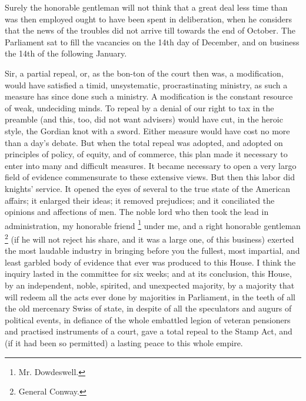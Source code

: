 Surely the honorable gentleman will not think that a great deal less time than was then employed ought to have been spent in deliberation, when he considers that the news of the troubles did not arrive till towards the end of October. The Parliament sat to fill the vacancies on the 14th day of December, and on business the 14th of the following January.

Sir, a partial repeal, or, as the bon-ton of the court then was, a modification, would have satisfied a timid, unsystematic, procrastinating ministry, as such a measure has since done such a ministry. A modification is the constant resource of weak, undeciding minds. To repeal by a denial of our right to tax in the preamble (and this, too, did not want advisers) would have cut, in the heroic style, the Gordian knot with a sword. Either measure would have cost no more than a day's debate. But when the total repeal was adopted, and adopted on principles of policy, of equity, and of commerce, this plan made it necessary to enter into many and difficult measures. It became necessary to open a very largo field of evidence commensurate to these extensive views. But then this labor did knights' service. It opened the eyes of several to the true state of the American affairs; it enlarged their ideas; it removed prejudices; and it conciliated the opinions and affections of men. The noble lord who then took the lead in administration, my honorable friend
\footnote{Mr. Dowdeswell.}
under me, and a right honorable gentleman
\footnote{General Conway.}
(if he will not reject his share, and it was a large one, of this business) exerted the most laudable industry in bringing before you the fullest, most impartial, and least garbled body of evidence that ever was produced to this House. I think the inquiry lasted in the committee for six weeks; and at its conclusion, this House, by an independent, noble, spirited, and unexpected majority, by a majority that will redeem all the acts ever done by majorities in Parliament, in the teeth of all the old mercenary Swiss of state, in despite of all the speculators and augurs of political events, in defiance of the whole embattled legion of veteran pensioners and practised instruments of a court, gave a total repeal to the Stamp Act, and (if it had been so permitted) a lasting peace to this whole empire.

